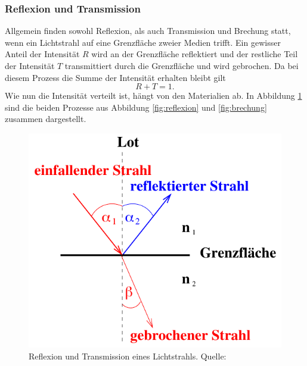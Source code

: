\subsubsection*{Reflexion und Transmission}
\label{sec:RefTrans}
Allgemein finden sowohl Reflexion, als auch Transmission und Brechung statt, wenn ein Lichtstrahl auf eine Grenzfläche zweier
Medien trifft. Ein gewisser Anteil der Intensität $R$ wird an der Grenzfläche reflektiert und der restliche
Teil der Intensität $T$ transmittiert durch die Grenzfläche und wird gebrochen. Da bei diesem Prozess die
Summe der Intensität erhalten bleibt gilt
\begin{equation}
    R+T=1.
\end{equation}
Wie nun die Intensität verteilt ist, hängt von den Materialien ab. In Abbildung \ref{fig:RefTrans}
sind die beiden Prozesse aus Abbildung \ref{fig:reflexion} und \ref{fig:brechung} zusammen dargestellt.
\begin{figure}[H]
    \centering
    \includegraphics[scale = 0.5]{pictures/ReflexionTransmission.png}
    \caption{Reflexion und Transmission eines Lichtstrahls. Quelle: \cite{AP01}}
    \label{fig:RefTrans}
\end{figure}

